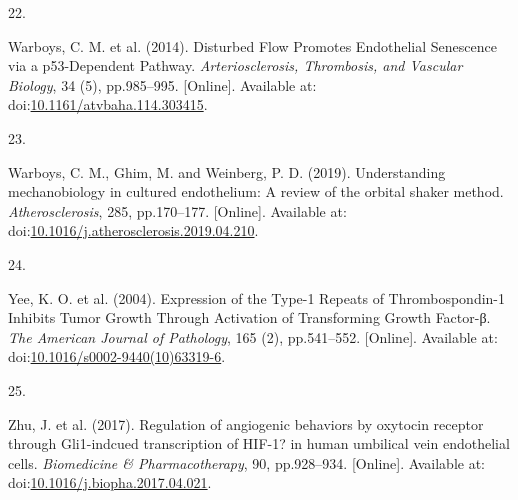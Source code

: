 \documentclass[
  11pt,
]{article}
\newlength{\cslhangindent}
\newlength{\csllabelwidth}
\newlength{\cslentryspacingunit} %
\newenvironment{CSLReferences}[2] %
 {%
  \setlength{\parindent}{0pt}
  \ifodd #1
  \let\oldpar\par
  \def\par{\hangindent=\cslhangindent\oldpar}
  \fi
  \setlength{\parskip}{#2\cslentryspacingunit}
 }%
 {}
\newcommand{\CSLLeftMargin}[1]{\parbox[t]{\csllabelwidth}{#1}}
\newcommand{\CSLRightInline}[1]{\parbox[t]{\linewidth - \csllabelwidth}{#1}\break}
\begin{document}
\begin{CSLReferences}{0}{0}
\leavevmode{}%
\CSLLeftMargin{22. }
\CSLRightInline{Warboys, C. M. {et al.} (2014). {Disturbed Flow Promotes Endothelial Senescence via a p53-Dependent Pathway}. \emph{Arteriosclerosis, Thrombosis, and Vascular Biology}, 34 (5), pp.985--995. {[}Online{]}. Available at: doi:\href{https://doi.org/10.1161/atvbaha.114.303415}{10.1161/atvbaha.114.303415}.}

\leavevmode{}%
\CSLLeftMargin{23. }
\CSLRightInline{Warboys, C. M., Ghim, M. and Weinberg, P. D. (2019). {Understanding mechanobiology in cultured endothelium: A review of the orbital shaker method}. \emph{Atherosclerosis}, 285, pp.170--177. {[}Online{]}. Available at: doi:\href{https://doi.org/10.1016/j.atherosclerosis.2019.04.210}{10.1016/j.atherosclerosis.2019.04.210}.}

\leavevmode{}%
\CSLLeftMargin{24. }
\CSLRightInline{Yee, K. O. {et al.} (2004). {Expression of the Type-1 Repeats of Thrombospondin-1 Inhibits Tumor Growth Through Activation of Transforming Growth Factor-β}. \emph{The American Journal of Pathology}, 165 (2), pp.541--552. {[}Online{]}. Available at: doi:\href{https://doi.org/10.1016/s0002-9440(10)63319-6}{10.1016/s0002-9440(10)63319-6}.}

\leavevmode{}%
\CSLLeftMargin{25. }
\CSLRightInline{Zhu, J. {et al.} (2017). {Regulation of angiogenic behaviors by oxytocin receptor through Gli1-indcued transcription of HIF-1? in human umbilical vein endothelial cells}. \emph{Biomedicine \& Pharmacotherapy}, 90, pp.928--934. {[}Online{]}. Available at: doi:\href{https://doi.org/10.1016/j.biopha.2017.04.021}{10.1016/j.biopha.2017.04.021}.}

\end{CSLReferences}
\end{document}
